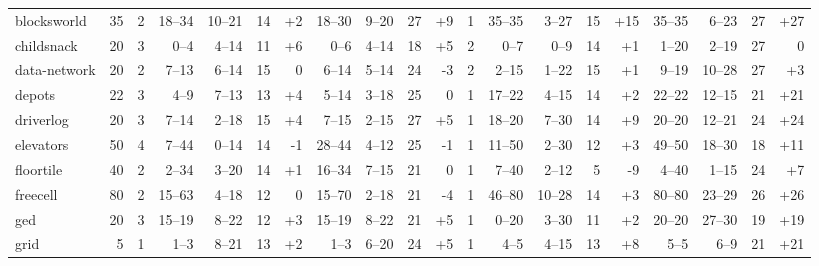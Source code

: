 \documentclass{article}
\begin{document}
\begin{table}[h]
\begin{tabular}{l@{}rr|rrrr|rrrr|r|rrrr|rrrr}
   blocksworld &     35 &   2 &   18--34 &  10--21 &  14 &  {\color{blue}+2} &   18--30 &   9--20 &  27 &   {\color{blue}+9} &   1 &    35--35 &   3--27 &  15 &  {\color{blue}+15} &    35--35 &   6--23 &  27 &  {\color{blue}+27} \\
    childsnack &     20 &   3 &     0--4 &   4--14 &  11 &  {\color{blue}+6} &     0--6 &   4--14 &  18 &   {\color{blue}+5} &   2 &      0--7 &    0--9 &  14 &   {\color{blue}+1} &     1--20 &   2--19 &  27 &                  0 \\
  data-network &     20 &   2 &    7--13 &   6--14 &  15 &                 0 &    6--14 &   5--14 &  24 &    {\color{red}-3} &   2 &     2--15 &   1--22 &  15 &   {\color{blue}+1} &     9--19 &  10--28 &  27 &   {\color{blue}+3} \\
        depots &     22 &   3 &     4--9 &   7--13 &  13 &  {\color{blue}+4} &    5--14 &   3--18 &  25 &                  0 &   1 &    17--22 &   4--15 &  14 &   {\color{blue}+2} &    22--22 &  12--15 &  21 &  {\color{blue}+21} \\
     driverlog &     20 &   3 &    7--14 &   2--18 &  15 &  {\color{blue}+4} &    7--15 &   2--15 &  27 &   {\color{blue}+5} &   1 &    18--20 &   7--30 &  14 &   {\color{blue}+9} &    20--20 &  12--21 &  24 &  {\color{blue}+24} \\
     elevators &     50 &   4 &    7--44 &   0--14 &  14 &   {\color{red}-1} &   28--44 &   4--12 &  25 &    {\color{red}-1} &   1 &    11--50 &   2--30 &  12 &   {\color{blue}+3} &    49--50 &  18--30 &  18 &  {\color{blue}+11} \\
     floortile &     40 &   2 &    2--34 &   3--20 &  14 &  {\color{blue}+1} &   16--34 &   7--15 &  21 &                  0 &   1 &     7--40 &   2--12 &   5 &    {\color{red}-9} &     4--40 &   1--15 &  24 &   {\color{blue}+7} \\
      freecell &     80 &   2 &   15--63 &   4--18 &  12 &                 0 &   15--70 &   2--18 &  21 &    {\color{red}-4} &   1 &    46--80 &  10--28 &  14 &   {\color{blue}+3} &    80--80 &  23--29 &  26 &  {\color{blue}+26} \\
           ged &     20 &   3 &   15--19 &   8--22 &  12 &  {\color{blue}+3} &   15--19 &   8--22 &  21 &   {\color{blue}+5} &   1 &     0--20 &   3--30 &  11 &   {\color{blue}+2} &    20--20 &  27--30 &  19 &  {\color{blue}+19} \\
          grid &      5 &   1 &     1--3 &   8--21 &  13 &  {\color{blue}+2} &     1--3 &   6--20 &  24 &   {\color{blue}+5} &   1 &      4--5 &   4--15 &  13 &   {\color{blue}+8} &      5--5 &    6--9 &  21 &  {\color{blue}+21} \\

\end{tabular}
\end{table}
\end{document}
